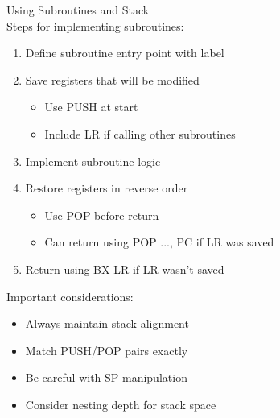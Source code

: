 \begin{KR}{Using Subroutines and Stack}\\
Steps for implementing subroutines:
\begin{enumerate}
  \item Define subroutine entry point with label
  \item Save registers that will be modified
    \begin{itemize}
      \item Use PUSH at start
      \item Include LR if calling other subroutines
    \end{itemize}
  \item Implement subroutine logic
  \item Restore registers in reverse order
    \begin{itemize}
      \item Use POP before return
      \item Can return using POP {..., PC} if LR was saved
    \end{itemize}
  \item Return using BX LR if LR wasn't saved
\end{enumerate}
\end{KR}

\begin{remark}
Important considerations:
\begin{itemize}
  \item Always maintain stack alignment
  \item Match PUSH/POP pairs exactly
  \item Be careful with SP manipulation
  \item Consider nesting depth for stack space
\end{itemize}
\end{remark}

